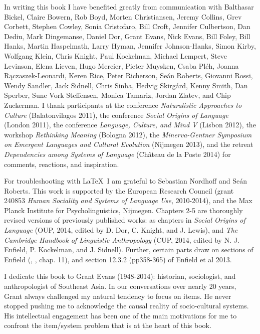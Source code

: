 
In writing this book I have benefited greatly from communication with Balthasar Bickel, Claire Bowern, Rob 
Boyd, Morten Christiansen, Jeremy Collins, Grev Corbett, Stephen Cowley, Sonia Cristofaro, Bill Croft, Jennifer Culbertson, Dan Dediu, Mark Dingemanse, Daniel Dor, Grant Evans\dag, Nick Evans, Bill Foley, Bill Hanks, Martin Haspelmath, Larry Hyman, Jennifer Johnson-Hanks, Simon Kirby, Wolfgang Klein, Chris Knight, Paul Kockelman, Michael Lempert, Steve Levinson, Elena Lieven, Hugo Mercier, Pieter Muysken, Csaba Pl\'{e}h, Joanna R\k{a}czaszek-Leonardi, Keren Rice, Peter Richerson, Se\'{a}n Roberts, Giovanni Rossi, Wendy Sandler, Jack Sidnell, Chris Sinha, Hedvig Skirg\aa{}rd, Kenny Smith, Dan Sperber, Sune Vork Steffensen, Monica Tamariz, Jordan Zlatev, and Chip Zuckerman. I thank participants at the conference 
\textit{Naturalistic Approaches to Culture} (Balatonvilagos 2011), the 
conference \textit{Social Origins of Language} (London 2011), the 
conference \textit{Language, Culture, and Mind V} (Lisbon 2012), the workshop 
\textit{Rethinking Meaning} (Bologna 2012), the \textit{Minerva-Gentner Symposium on 
Emergent Languages and Cultural Evolution} (Nijmegen 2013), and the retreat \textit{Dependencies among Systems of Language} (Ch\^{a}teau de la Poste 2014) for comments, reactions, and inspiration. 

For troubleshooting with \LaTeX\ I am grateful to Sebastian Nordhoff and Se\'{a}n Roberts. This work is supported by the European Research Council 
(grant 240853 \textit{Human Sociality and Systems of Language Use}, 2010-2014), and 
the Max Planck Institute for Psycholinguistics, Nijmegen. Chapters 2-5 are thoroughly revised versions of previously published works: as chapters in 
\textit{Social Origins of Language} (OUP, 2014, edited by D. Dor, C. Knight, and J. Lewis), and \textit{The Cambridge Handbook of Linguistic Anthropology} 
(CUP, 2014, edited by N. J. Enfield, P. Kockelman, and J. Sidnell). Further, certain parts draw on sections of Enfield (\citeyear{enfield_transmission_2008}, \citeyear{enfield_relationship_2013}, 
chap. 11), and section 12.3.2 (pp358-365) of Enfield et al 2013. 

I dedicate this book to Grant Evans (1948-2014): historian, sociologist, and anthropologist of Southeast Asia. In our conversations over nearly 20 years, Grant always challenged my natural tendency to focus on items. He never stopped pushing me to acknowledge the causal reality of socio-cultural systems. His intellectual engagement has been one of the main motivations for me to confront the item/system problem that is at the heart of this book.